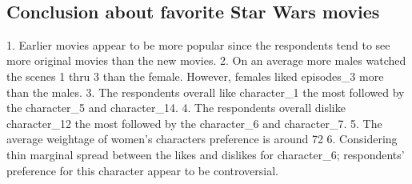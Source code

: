 \documentclass[11pt]{article}
\begin{document}
    \begin{center}
    \end{center}
    { \hspace*{\fill} \\}
    
    \subsection{Conclusion about favorite Star Wars
movies}\label{conclusion-about-favorite-star-wars-movies}
1. Earlier movies appear to be more popular since the respondents tend to see more original movies than the new movies. 
2. On an average more males watched the scenes 1 thru 3 than the female. However, females liked episodes_3 more than the males.
3. The respondents overall like character_1 the most followed by the character_5 and character_14.
4. The respondents overall dislike character_12 the most followed by the character_6 and character_7.
5. The average weightage of women's characters preference is around 72%
6. Considering thin marginal spread between the likes and dislikes for character_6; respondents' preference for this character appear to be controversial.

    
    
    
    
\end{document}
